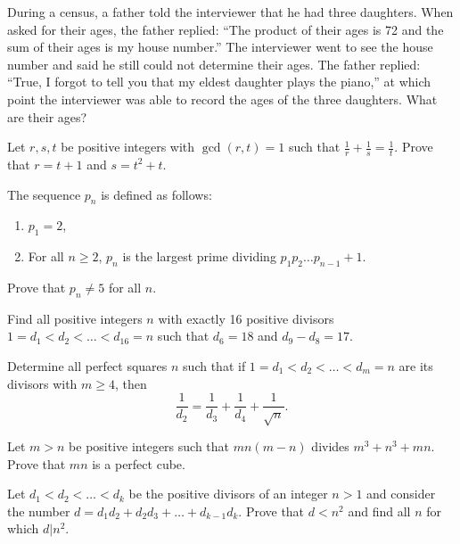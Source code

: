 \documentclass[12pt]{memoir}
\begin{document}
\begin{Ej}
During a census, a father told the interviewer that he had three daughters. When asked for their ages, the father replied: ``The product of their ages is 72 and the sum of their ages is my house number.'' The interviewer went to see the house number and said he still could not determine their ages. The father replied: ``True, I forgot to tell you that my eldest daughter plays the piano,'' at which point the interviewer was able to record the ages of the three daughters. What are their ages?
\end{Ej}

\begin{Ej}
Let \(r, s, t\) be positive integers with \(\gcd(r, t) = 1\) such that \(\frac{1}{r} + \frac{1}{s} = \frac{1}{t}\). Prove that \(r = t + 1\) and \(s = t^2 + t\).
\end{Ej}

\begin{Ej}
The sequence \(p_n\) is defined as follows:
\begin{enumerate}[label=(\roman*)]
    \item \(p_1 = 2\),
    \item For all \(n \geq 2\), \(p_n\) is the largest prime dividing \(p_1 p_2 \dots p_{n-1} + 1\).
\end{enumerate}
Prove that \(p_n \neq 5\) for all \(n\).
\end{Ej}

\begin{Ej}
Find all positive integers \(n\) with exactly 16 positive divisors \(1 = d_1 < d_2 < \dots < d_{16} = n\) such that \(d_6 = 18\) and \(d_9 - d_8 = 17\).
\end{Ej}

\begin{Ej}
Determine all perfect squares \(n\) such that if \(1 = d_1 < d_2 < \dots < d_m = n\) are its divisors with \(m \geq 4\), then
\[
    \frac{1}{d_2} = \frac{1}{d_3} + \frac{1}{d_4} + \frac{1}{\sqrt{n}}.
\]
\end{Ej}

\begin{Ej}
Let \(m > n\) be positive integers such that \(mn(m - n)\) divides \(m^3 + n^3 + mn\). Prove that \(mn\) is a perfect cube.
\end{Ej}

\begin{Ej}
Let \(d_1 < d_2 < \dots < d_k\) be the positive divisors of an integer \(n > 1\) and consider the number \(d = d_1d_2 + d_2d_3 + \dots + d_{k-1}d_k\). Prove that \(d < n^2\) and find all \(n\) for which \(d|n^2\).
\end{Ej}
\end{document}
